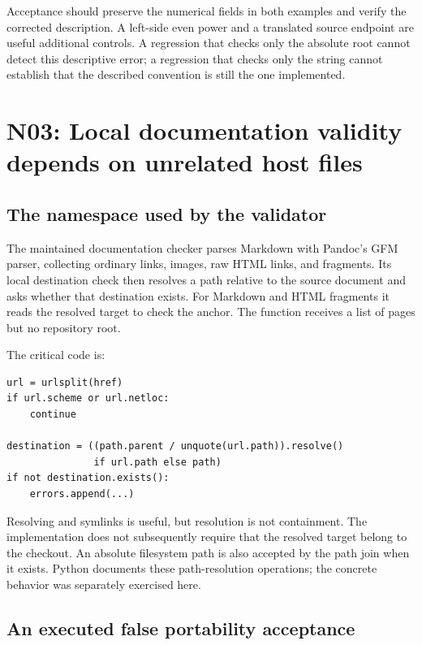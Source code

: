 \documentclass[11pt,letterpaper]{article}
\newcommand{\code}[1]{\texttt{\detokenize{#1}}}
\begin{document}
Acceptance should preserve the numerical fields in both examples and verify
the corrected description. A left-side even power and a translated source
endpoint are useful additional controls. A regression that checks only the
absolute root cannot detect this descriptive error; a regression that checks
only the string cannot establish that the described convention is still the
one implemented.

\section{N03: Local documentation validity depends on unrelated host files}
\label{sec:n03}
\subsection{The namespace used by the validator}

The maintained documentation checker parses Markdown with Pandoc's GFM
parser, collecting ordinary links, images, raw HTML links, and fragments. Its
local destination check then resolves a path relative to the source document
and asks whether that destination exists. For Markdown and HTML fragments it
reads the resolved target to check the anchor. The function receives a list of
pages but no repository root.\cite{doclinks,maintaining}

The critical code is:
\begin{lstlisting}
url = urlsplit(href)
if url.scheme or url.netloc:
    continue

destination = ((path.parent / unquote(url.path)).resolve()
               if url.path else path)
if not destination.exists():
    errors.append(...)
\end{lstlisting}

Resolving \code{..} and symlinks is useful, but resolution is not containment.
The implementation does not subsequently require that the resolved target
belong to the checkout. An absolute filesystem path is also accepted by the
path join when it exists. Python documents these path-resolution operations;
the concrete behavior was separately exercised here.\cite{pathlib}

\subsection{An executed false portability acceptance}
\end{document}
